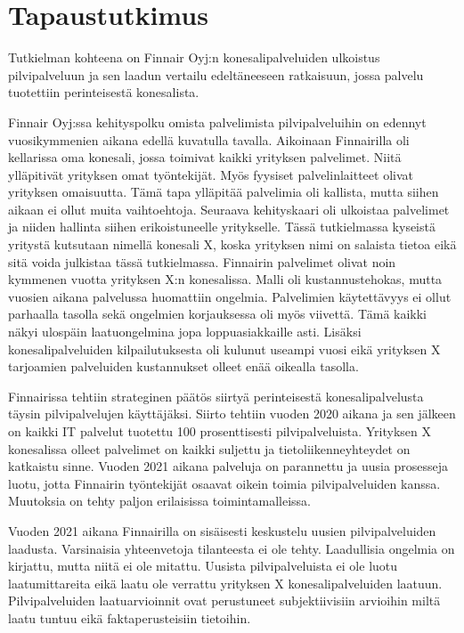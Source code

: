 \chapter{Tapaustutkimus\label{tapautustutkimus}}
Tutkielman kohteena on Finnair Oyj:n konesalipalveluiden ulkoistus pilvipalveluun ja sen laadun vertailu edeltäneeseen ratkaisuun, jossa palvelu tuotettiin perinteisestä konesalista.

Finnair Oyj:ssa kehityspolku omista palvelimista pilvipalveluihin on edennyt vuosikymmenien aikana edellä kuvatulla tavalla. Aikoinaan Finnairilla oli kellarissa oma konesali, jossa toimivat kaikki yrityksen palvelimet. Niitä ylläpitivät yrityksen omat työntekijät. Myös fyysiset palvelinlaitteet olivat yrityksen omaisuutta. Tämä tapa ylläpitää palvelimia oli kallista, mutta siihen aikaan ei ollut muita vaihtoehtoja. Seuraava kehityskaari oli ulkoistaa palvelimet ja niiden hallinta siihen erikoistuneelle yritykselle. Tässä tutkielmassa kyseistä yritystä kutsutaan nimellä konesali X, koska yrityksen nimi on salaista tietoa eikä sitä voida julkistaa tässä tutkielmassa. Finnairin palvelimet olivat noin kymmenen vuotta yrityksen X:n konesalissa. Malli oli kustannustehokas, mutta vuosien aikana palvelussa huomattiin ongelmia. Palvelimien käytettävyys ei ollut parhaalla tasolla sekä ongelmien korjauksessa oli myös viivettä. Tämä kaikki näkyi ulospäin laatuongelmina jopa loppuasiakkaille asti. Lisäksi konesalipalveluiden kilpailutuksesta oli kulunut useampi vuosi eikä yrityksen X tarjoamien palveluiden kustannukset olleet enää oikealla tasolla.

Finnairissa tehtiin strateginen päätös siirtyä perinteisestä konesalipalvelusta täysin pilvipalvelujen käyttäjäksi. Siirto tehtiin vuoden 2020 aikana ja sen jälkeen on kaikki IT palvelut tuotettu 100 prosenttisesti pilvipalveluista. Yrityksen X konesalissa olleet palvelimet on kaikki suljettu ja tietoliikenneyhteydet on katkaistu sinne. Vuoden 2021 aikana palveluja on parannettu ja uusia prosesseja luotu, jotta Finnairin työntekijät osaavat oikein toimia pilvipalveluiden kanssa. Muutoksia on tehty paljon erilaisissa toimintamalleissa.

Vuoden 2021 aikana Finnairilla on sisäisesti keskustelu uusien pilvipalveluiden laadusta. Varsinaisia yhteenvetoja tilanteesta ei ole tehty. Laadullisia ongelmia on kirjattu, mutta niitä ei ole mitattu. Uusista pilvipalveluista ei ole luotu laatumittareita eikä laatu ole verrattu yrityksen X konesalipalveluiden laatuun. Pilvipalveluiden laatuarvioinnit ovat perustuneet subjektiivisiin arvioihin miltä laatu tuntuu eikä faktaperusteisiin tietoihin. 
